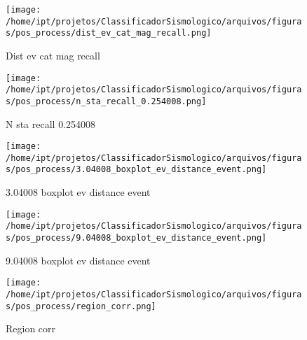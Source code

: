                     \begin{figure}[H]
                        \centering
                        \texttt{[image: /home/ipt/projetos/ClassificadorSismologico/arquivos/figuras/pos\_process/dist\_ev\_cat\_mag\_recall.png]}
                        \caption{Dist ev cat mag recall}
                        \label{fig:dist_ev_cat_mag_recall}
                    \end{figure}
                

                    \begin{figure}[H]
                        \centering
                        \texttt{[image: /home/ipt/projetos/ClassificadorSismologico/arquivos/figuras/pos\_process/n\_sta\_recall\_0.254008.png]}
                        \caption{N sta recall 0.254008}
                        \label{fig:n_sta_recall_0.254008}
                    \end{figure}
                

                    \begin{figure}[H]
                        \centering
                        \texttt{[image: /home/ipt/projetos/ClassificadorSismologico/arquivos/figuras/pos\_process/3.04008\_boxplot\_ev\_distance\_event.png]}
                        \caption{3.04008 boxplot ev distance event}
                        \label{fig:3.04008_boxplot_ev_distance_event}
                    \end{figure}
                

                    \begin{figure}[H]
                        \centering
                        \texttt{[image: /home/ipt/projetos/ClassificadorSismologico/arquivos/figuras/pos\_process/9.04008\_boxplot\_ev\_distance\_event.png]}
                        \caption{9.04008 boxplot ev distance event}
                        \label{fig:9.04008_boxplot_ev_distance_event}
                    \end{figure}
                

                    \begin{figure}[H]
                        \centering
                        \texttt{[image: /home/ipt/projetos/ClassificadorSismologico/arquivos/figuras/pos\_process/region\_corr.png]}
                        \caption{Region corr}
                        \label{fig:region_corr}
                    \end{figure}
                

